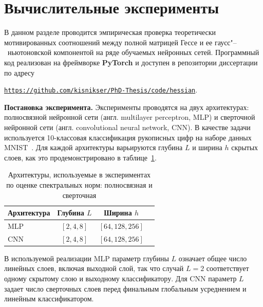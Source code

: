 \section{Вычислительные эксперименты}

В данном разделе проводится эмпирическая проверка теоретически мотивированных соотношений между полной матрицей Гессе и ее гаусс"--~ньютоновской компонентой на ряде обучаемых нейронных сетей. Программный код реализован на фреймворке \textbf{PyTorch} и доступен в репозитории диссертации по адресу
\begin{center}
    \href{https://github.com/kisnikser/PhD-Thesis/tree/main/code/hessian}{\texttt{https://github.com/kisnikser/PhD-Thesis/code/hessian}}.
\end{center}

\textbf{Постановка эксперимента.} Эксперименты проводятся на двух архитектурах: полносвязной нейронной сети (англ. multilayer perceptron, MLP) и сверточной нейронной сети (англ. convolutional neural network, CNN). В качестве задачи используется 10-классовая классификация рукописных цифр на наборе данных MNIST~\cite{lecun1998mnist}. Для каждой архитектуры варьируются глубина $L$ и ширина $h$ скрытых слоев, как это продемонстрировано в таблице~\ref{tab:hessian-exp-architectures}.

\begin{table}[htbp]
    \centering
    \caption{Архитектуры, используемые в экспериментах по оценке спектральных норм: полносвязная и сверточная}
    \label{tab:hessian-exp-architectures}
    \begin{SingleSpace}
        \begin{tabular}{@{}lccc@{}} 
            \toprule
            Архитектура & Глубина $L$ & Ширина $h$ \\
            \midrule
            MLP & $[2, 4, 8]$ & $[64, 128, 256]$ \\
            CNN & $[2, 4, 8]$ & $[64, 128, 256]$ \\
            \bottomrule
        \end{tabular}
    \end{SingleSpace}
\end{table}

В используемой реализации MLP параметр глубины $L$ означает общее число линейных слоев, включая выходной слой, так что случай $L=2$ соответствует одному скрытому слою и выходному классификатору. Для CNN параметр $L$ задает число сверточных слоев перед финальным глобальным усреднением и линейным классификатором.


